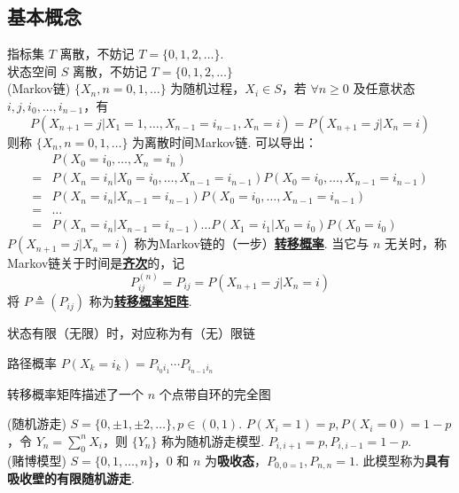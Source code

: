 \documentclass[./main.tex]{subfiles}
\begin{document}
\subsection{基本概念}
指标集 $T$ 离散，不妨记 $T=\{0,1,2,\dots\}$. \\
\indent 状态空间 $S$ 离散，不妨记 $T=\{0,1,2,\dots\}$\\
(Markov链) $\{X_n,n=0,1,\dots\}$ 为随机过程，$X_i\in S$，若 $\forall n\ge 0$ 及任意状态 $i,j,i_0,\dots,i_{n-1}$，有
\begin{equation}P(X_{n+1}=j|X_1=1,\dots,X_{n-1}=i_{n-1},X_n=i)=P(X_{n+1}=j|X_n=i)\end{equation}
则称 $\{X_n,n=0,1,\dots\}$ 为离散时间Markov链. 可以导出：
\begin{align*}
    &P(X_0=i_0,\dots,X_n=i_n)\\
    =&P(X_n=i_n|X_0=i_0,\dots,X_{n-1}=i_{n-1})P(X_0=i_0,\dots,X_{n-1}=i_{n-1})\\
    =&P(X_n=i_n|X_{n-1}=i_{n-1})P(X_0=i_0,\dots,X_{n-1}=i_{n-1})\\
    =&\dots\\
    =&P(X_n=i_n|X_{n-1}=i_{n-1})\dots P(X_1=i_1|X_0=i_0)P(X_0=i_0)
\end{align*}
$P(X_{n+1}=j|X_n=i)$ 称为Markov链的（一步）\underline{\textbf{转移概率}}. 当它与 $n$ 无关时，称Markov链关于时间是\textbf{\underline{齐次}}的，记
\begin{equation}P_{ij}^{(n)}=P_{ij}=P(X_{n+1}=j|X_n=i)\end{equation}
将 $P\triangleq(P_{ij})$ 称为\underline{\textbf{转移概率矩阵}}. 
\begin{enumerate*}
    \item 状态有限（无限）时，对应称为有（无）限链
    \item 路径概率 $P(X_k=i_k)=P_{i_0i_1}\cdots P_{i_{n-1}i_n}$
    \item 转移概率矩阵描述了一个 $n$ 个点带自环的完全图
\end{enumerate*}
(随机游走) $S=\{0,\pm 1,\pm 2,\dots\},p\in (0,1)$. $P(X_i=1)=p,P(X_i=0)=1-p$，令 $Y_n=\sum_0^nX_i$，则 $\{Y_n\}$ 称为随机游走模型. $P_{i,i+1}=p,P_{i,i-1}=1-p$. \\
(赌博模型) $S=\{0,1,\dots,n\}$，0 和 $n$ 为\textbf{吸收态}，$P_{0,0=1},P_{n,n}=1$. 此模型称为\textbf{具有吸收壁的有限随机游走}. 
\end{document}
